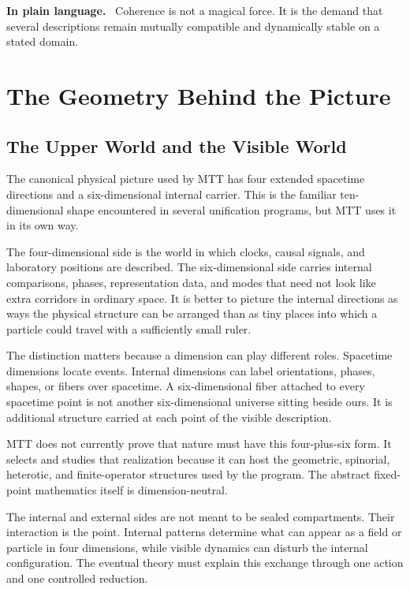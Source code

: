 \documentclass[11pt,openany]{book}
\newenvironment{plainsummary}
  {\par\small\noindent\textbf{In plain language.}\ }
  {\par}
\begin{document}
\begin{plainsummary}
Coherence is not a magical force. It is the demand that several descriptions
remain mutually compatible and dynamically stable on a stated domain.
\end{plainsummary}

\part{The Geometry Behind the Picture}

\chapter{The Upper World and the Visible World}

The canonical physical picture used by MTT has four extended spacetime
directions and a six-dimensional internal carrier. This is the familiar
ten-dimensional shape encountered in several unification programs, but MTT
uses it in its own way.

The four-dimensional side is the world in which clocks, causal signals, and
laboratory positions are described. The six-dimensional side carries
internal comparisons, phases, representation data, and modes that need not
look like extra corridors in ordinary space. It is better to picture the
internal directions as ways the physical structure can be arranged than as
tiny places into which a particle could travel with a sufficiently small
ruler.

The distinction matters because a dimension can play different roles.
Spacetime dimensions locate events. Internal dimensions can label
orientations, phases, shapes, or fibers over spacetime. A six-dimensional
fiber attached to every spacetime point is not another six-dimensional
universe sitting beside ours. It is additional structure carried at each
point of the visible description.

MTT does not currently prove that nature must have this four-plus-six form.
It selects and studies that realization because it can host the geometric,
spinorial, heterotic, and finite-operator structures used by the program. The
abstract fixed-point mathematics itself is dimension-neutral.

The internal and external sides are not meant to be sealed compartments.
Their interaction is the point. Internal patterns determine what can appear
as a field or particle in four dimensions, while visible dynamics can disturb
the internal configuration. The eventual theory must explain this exchange
through one action and one controlled reduction.
\end{document}
